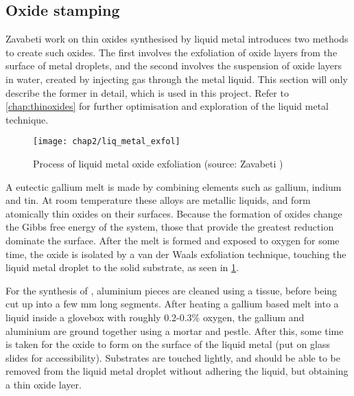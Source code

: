 \documentclass[../../Matt_Gebert_Honours_Thesis.tex]{subfiles}
\begin{document}
	\subsection{Oxide stamping}
	Zavabeti \etals\cite{zavabeti_liquid_2017} work on thin oxides synthesised by liquid metal introduces two methods to create such oxides. The first involves the exfoliation of oxide layers from the surface of metal droplets, and the second involves the suspension of oxide layers in water, created by injecting gas through the metal liquid. This section will only describe the former in detail, which is used in this project. Refer to \cref{chap:thinoxides} for further optimisation and exploration of the liquid metal technique.
	
	\begin{figure}[H]
		\texttt{[image: chap2/liq\_metal\_exfol]}
		\caption[Liquid metal oxide exfoliation]{Process of liquid metal oxide exfoliation (source: Zavabeti \etal{}\cite{zavabeti_liquid_2017})}\label{fig:liq_metal_exfoliation}
	\end{figure}	
	
	A eutectic gallium melt is made by combining elements such as gallium, indium and tin. At room temperature these alloys are metallic liquids, and form atomically thin oxides on their surfaces. Because the formation of oxides change the Gibbs free energy of the system, those that provide the greatest reduction dominate the surface\cite{zavabeti_liquid_2017}. After the melt is formed and exposed to oxygen for some time, the oxide is isolated by a van der Waals exfoliation technique, touching the liquid metal droplet to the solid substrate, as seen in \cref{fig:liq_metal_exfoliation}.
	
	For the synthesis of \aluminimumoxide{}, aluminium pieces are cleaned using a tissue, before being cut up into a few mm long segments. After heating a gallium based melt into a liquid inside a glovebox with roughly 0.2-0.3\% oxygen, the gallium and aluminium are ground together using a mortar and pestle. After this, some time is taken for the oxide to form on the surface of the liquid metal (put on glass slides for accessibility). Substrates are touched lightly, and should be able to be removed from the liquid metal droplet without adhering the liquid, but obtaining a thin oxide layer.
	
\end{document}

